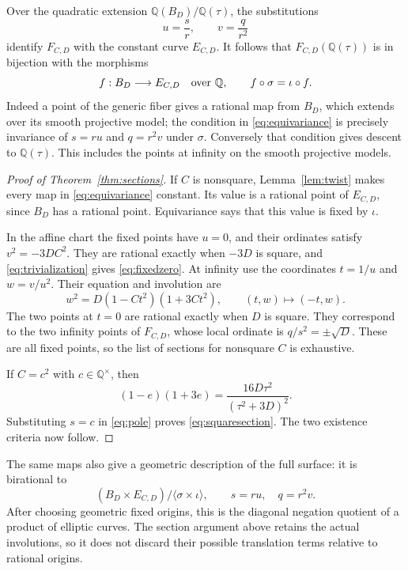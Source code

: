 \documentclass[11pt,a4paper]{article}
\newcommand{\Q}{\mathbb Q}\newcommand{\Z}{\mathbb Z}
\begin{document}
Over the quadratic extension $\Q(B_D)/\Q(\tau)$, the substitutions
\begin{equation}\label{eq:trivialization}
                    u=\frac{s}{r},\qquad v=\frac{q}{r^2}
\end{equation}
identify $F_{C,D}$ with the constant curve $E_{C,D}$. It follows
that $F_{C,D}(\Q(\tau))$ is in bijection with the morphisms
\begin{equation}\label{eq:equivariance}
          f:B_D\longrightarrow E_{C,D}\quad\hbox{over }\Q,
          \qquad f\circ\sigma=\iota\circ f.
\end{equation}
Indeed a point of the generic fiber gives a rational map from $B_D$,
which extends over its smooth projective model; the condition in
\eqref{eq:equivariance} is precisely invariance of $s=ru$ and
$q=r^2v$ under $\sigma$. Conversely that condition gives descent
to $\Q(\tau)$. This includes the points at infinity on the
smooth projective models.

\begin{proof}[Proof of Theorem~\ref{thm:sections}]
If $C$ is nonsquare, Lemma~\ref{lem:twist} makes every map in
\eqref{eq:equivariance} constant. Its value is a rational point of
$E_{C,D}$, since $B_D$ has a rational point. Equivariance says that
this value is fixed by $\iota$.

In the affine chart the fixed points have $u=0$, and their ordinates
satisfy $v^2=-3DC^2$. They are rational exactly when $-3D$ is
square, and \eqref{eq:trivialization} gives
\eqref{eq:fixedzero}. At infinity use the coordinates
$t=1/u$ and $w=v/u^2$. Their equation and involution are
\[
 w^2=D(1-Ct^2)(1+3Ct^2),\qquad (t,w)\longmapsto(-t,w).
\]
The two points at $t=0$ are rational exactly when $D$ is square.
They correspond to the two infinity points of $F_{C,D}$, whose
local ordinate is $q/s^2=\pm\sqrt D$. These are all fixed points,
so the list of sections for nonsquare $C$ is exhaustive.

If $C=c^2$ with $c\in\Q^\times$, then
\[
 (1-e)(1+3e)=\frac{16D\tau^2}{(\tau^2+3D)^2}.
\]
Substituting $s=c$ in \eqref{eq:pole} proves
\eqref{eq:squaresection}. The two existence criteria now follow.
\end{proof}

The same maps also give a geometric description of the full surface:
it is birational to
\[
                  (B_D\times E_{C,D})/\langle\sigma\times\iota\rangle,
 \qquad s=ru,\quad q=r^2v.
\]
After choosing geometric fixed origins, this is the diagonal negation
quotient of a product of elliptic curves. The section argument above
retains the actual involutions, so it does not discard their possible
translation terms relative to rational origins.
\end{document}
